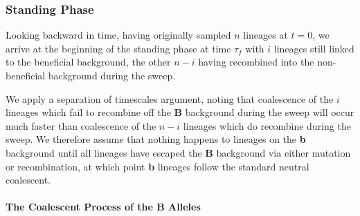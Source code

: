 \documentclass[a4paper,10pt]{article}
\newcommand{\fancyN}{$\mathcal N$ }
\newcommand{\fancyB}{$\mathcal B$ }
\begin{document}
\subsubsection*{Standing Phase}
Looking backward in time, having originally sampled $n$ lineages at $t=0$, we arrive at the beginning of the standing phase at time $\tau_{f}$ with $i$ lineages still linked to the beneficial background, the other $n-i$ having recombined into the non-beneficial background during the sweep.

We apply a separation of timescales argument, noting that coalescence of the $i$ lineages which fail to recombine off the \textbf{B} background during the sweep will occur much faster than coalescence of the $n-i$ lineages which do recombine during the sweep. We therefore assume that nothing happens to lineages on the \textbf{b} background until all lineages have escaped the \textbf{B} background via either mutation or recombination, at which point \textbf{b} lineages follow the standard neutral coalescent.

%


\paragraph{The Coalescent Process of the B Alleles}
\end{document}
